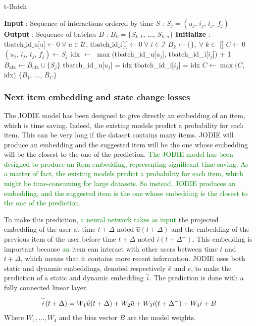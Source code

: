 \begin{algorithm}[htbp]
    \caption{t-Batch}
    \label{t-batch}
    \begin{algorithmic}[1]
        \STATE \textbf{Input} : Sequence of interactions ordered by time $S$ : $S_j = (u_j,\,i_j,\,t_j,\,f_j)$
        \STATE \textbf{Output} : Sequence of batches $B$ : $B_k = \{S_{k,1},\,...,\,S_{k,n} \}$
        \STATE \textbf{Initialize} : 
        \STATE \quad $\text{tbatch\_id\_u[u]} \leftarrow 0 \; \forall \; u \in \mathcal{U}$, \quad $\text{tbatch\_id\_i[i]} \leftarrow 0 \; \forall \; i \in \mathcal{I}$
        \STATE \quad $B_k \leftarrow \{ \},\; \forall \; k \in$ [\!]
        \STATE \quad $C \leftarrow 0$
            \STATE $(u_j,\,i_j,\,t_j,\,f_j) \leftarrow S_j$
            \STATE idx $\leftarrow$ $\max$(tbatch\_id\_u[$u_j$], tbatch\_id\_i[$i_j$]) + 1
            \STATE $B_\text{idx} \leftarrow B_\text{idx} \cup \{ S_j \}$
            \STATE tbatch\_id\_u[$u_j$] = idx
            \STATE tbatch\_id\_i[$i_j$] = idx
            \STATE $C \leftarrow \max(C,\,$idx)
        \ENDFOR
        \RETURN $\{ B_1,\,...,\,B_C \}$
    \end{algorithmic}
\end{algorithm}

\subsubsection{Next item embedding and state change losses}

The JODIE model has been designed to give directly an embedding of an item, which is time saving. Indeed, the existing models predict a probability for each item. This can be very long if the dataset contains many items. JODIE will produce an embedding and the suggested item will be the one whose embedding will be the closest to the one of the prediction. 
\textcolor{green}{The JODIE model has been designed to produce an item embedding, representing significant time-saving. As a matter of fact, the existing models predict a probability for each item, which might be time-consuming for large datasets. So instead, JODIE produces an embedding, and the suggested item is the one whose embedding is the closest to the one of the prediction. }

To make this prediction, \textcolor{green}{a neural network takes as input} %
the projected embedding of the user at time $t+\Delta$ noted $\widehat u(t+\Delta)$ and the embedding of the previous item of the user before time $t+\Delta$ noted $i(t+\Delta^-)$. This embedding is important because  \textcolor{green}{an} item can interact with other users between time $t$ and $t+\Delta$, which means that it contains more recent information. JODIE uses both static and dynamic embeddings, denoted respectively $\Bar{e}$ and $e$, to make the prediction of a static and dynamic embedding $\overset{\sim}{i}$. The prediction is done with a fully connected linear layer.
$$
\overset{\sim}{i} (t+\Delta) = W_1 \widehat u(t+\Delta) + W_2 \Bar{u} + W_3 i(t+\Delta^-) + W_4 \Bar{i} + B
$$
Where $W_1, ..., W_4$ and the bias vector $B$ are the model weights.\\

